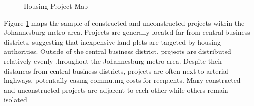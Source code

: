 \documentclass[12pt]{article}
\begin{document}

\begin{figure}[t!]
\centering
\caption{Housing Project Map}\label{figure:map}
\end{figure}

Figure \ref{figure:map} maps the sample of constructed and unconstructed projects within the Johannesburg metro area.  Projects are generally located far from central business districts, suggesting that inexpensive land plots are targeted by housing authorities.  Outside of the central business district, projects are distributed relatively evenly throughout the Johannesburg metro area.  Despite their distances from central business districts, projects are often next to arterial highways, potentially easing commuting costs for recipients.  Many constructed and unconstructed projects are adjacent to each other while others remain isolated.  


\end{document}
